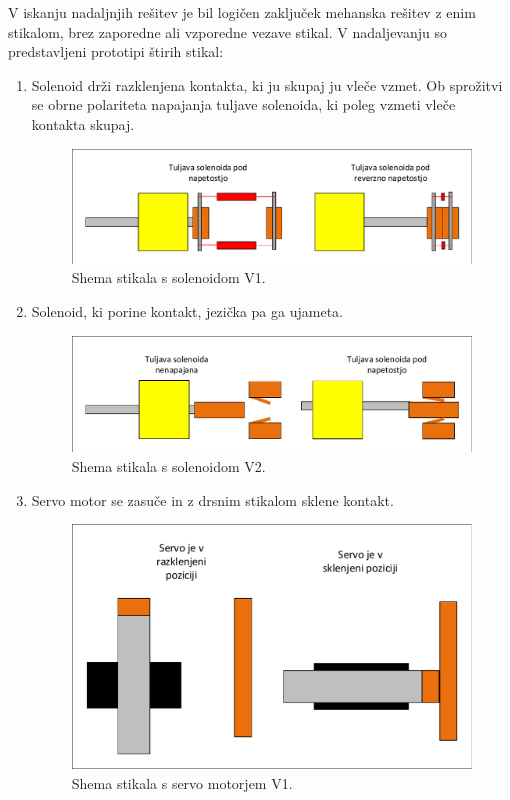 \documentclass[a4paper,twoside,openright,12pt,Slovene]{book}
\begin{document}
    
    V iskanju nadaljnjih rešitev je bil logičen zaključek mehanska rešitev z enim stikalom, brez zaporedne ali vzporedne vezave stikal. V nadaljevanju so predstavljeni prototipi štirih stikal:
    \begin{enumerate}
   
        \item  Solenoid drži razklenjena kontakta, ki ju skupaj ju vleče vzmet. Ob sprožitvi se obrne polariteta napajanja tuljave solenoida, ki poleg vzmeti vleče kontakta skupaj.
    \begin{figure}[H]
        \centering
        \includegraphics[width=1\columnwidth]{Sheme/StikaloSolenoidVerzija1.pdf}
        \caption{\label{/StikaloSolenoidVerzija1} Shema stikala s solenoidom V1.}
    \end{figure}
    
    \item  Solenoid, ki porine kontakt, jezička pa ga ujameta.
    \begin{figure}[H]
        \centering
        \includegraphics[width=1\columnwidth]{Sheme/StikaloSolenoidVerzija2.pdf}
        \caption{\label{/StikaloSolenoidVerzija2} Shema stikala s solenoidom V2.}
    \end{figure}
    
    \item  Servo motor se zasuče in z drsnim stikalom sklene kontakt.
    \begin{figure}[H]
        \centering
        \includegraphics[width=1\columnwidth]{Sheme/StikaloServoVerzija1.pdf}
        \caption{\label{StikaloServoVerzija1} Shema stikala s servo motorjem V1.}
    \end{figure}
    

\end{enumerate}
\end{document}
